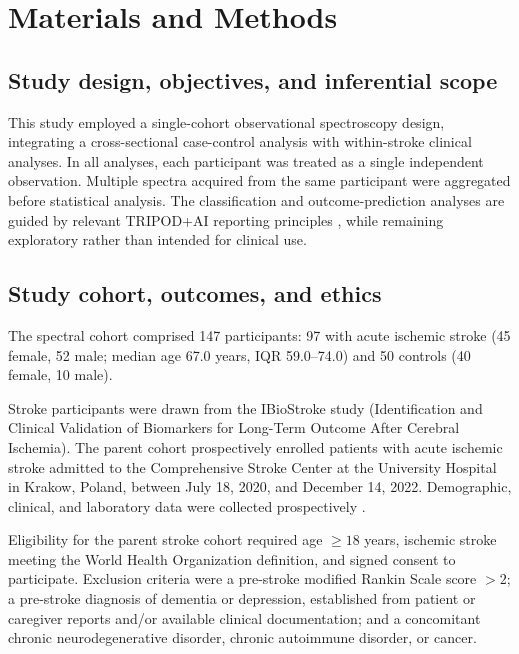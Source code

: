 \documentclass[preprint,12pt]{elsarticle}
\begin{document}
\section{Materials and Methods} 
\label{sec:methods}

\subsection{Study design, objectives, and inferential scope} \label{subsec:design}

This study employed a single-cohort observational spectroscopy design, integrating a cross-sectional case-control analysis with within-stroke clinical analyses. In all analyses, each participant was treated as a single independent observation. Multiple spectra acquired from the same participant were aggregated before statistical analysis. The classification and outcome-prediction analyses are guided by relevant TRIPOD+AI reporting principles \cite{collins2024}, while remaining exploratory rather than intended for clinical use.

\subsection{Study cohort, outcomes, and ethics} 
\label{subsec:cohort}

The spectral cohort comprised 147 participants: 97 with acute ischemic stroke (45 female, 52 male; median age 67.0 years, IQR 59.0--74.0) and 50 controls (40 female, 10 male).

Stroke participants were drawn from the IBioStroke study (Identification and Clinical Validation of Biomarkers for Long-Term Outcome After Cerebral Ischemia). The parent cohort prospectively enrolled patients with acute ischemic stroke admitted to the Comprehensive Stroke Center at the University Hospital in Krakow, Poland, between July 18, 2020, and December 14, 2022. Demographic, clinical, and laboratory data were collected prospectively \cite{deccwiek2025}.

Eligibility for the parent stroke cohort required age $\geq 18$ years, ischemic stroke meeting the World Health Organization definition, and signed consent to participate. Exclusion criteria were a pre-stroke modified Rankin Scale score $>2$; a pre-stroke diagnosis of dementia or depression, established from patient or caregiver reports and/or available clinical documentation; and a concomitant chronic neurodegenerative disorder, chronic autoimmune disorder, or cancer.
\end{document}
